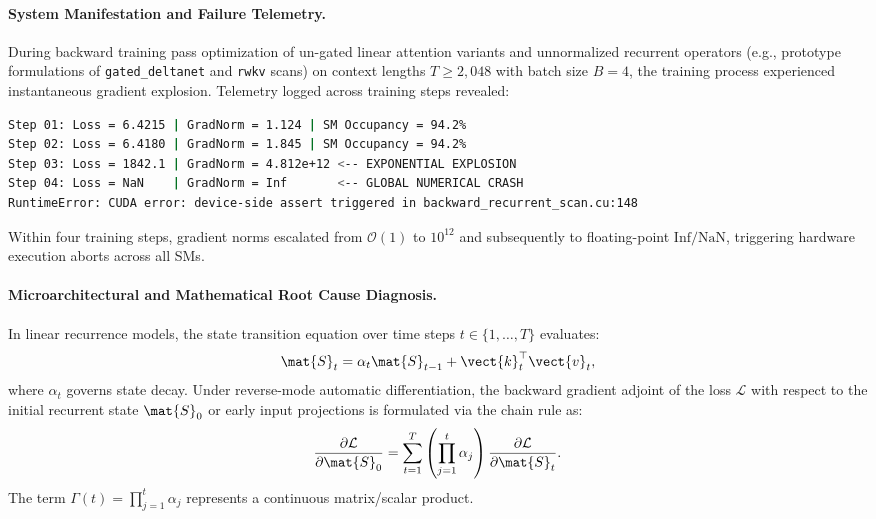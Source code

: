 \paragraph{System Manifestation and Failure Telemetry.}
During backward training pass optimization of un-gated linear attention variants and unnormalized recurrent operators (e.g., prototype formulations of \texttt{gated\_deltanet} and \texttt{rwkv} scans) on context lengths $T \ge 2{,}048$ with batch size $B=4$, the training process experienced instantaneous gradient explosion. Telemetry logged across training steps revealed:
\begin{lstlisting}[language=bash]
Step 01: Loss = 6.4215 | GradNorm = 1.124 | SM Occupancy = 94.2%
Step 02: Loss = 6.4180 | GradNorm = 1.845 | SM Occupancy = 94.2%
Step 03: Loss = 1842.1 | GradNorm = 4.812e+12 <-- EXPONENTIAL EXPLOSION
Step 04: Loss = NaN    | GradNorm = Inf       <-- GLOBAL NUMERICAL CRASH
RuntimeError: CUDA error: device-side assert triggered in backward_recurrent_scan.cu:148
\end{lstlisting}
Within four training steps, gradient norms escalated from $\mathcal{O}(1)$ to $10^{12}$ and subsequently to floating-point $\text{Inf}/\text{NaN}$, triggering hardware execution aborts across all SMs.

\paragraph{Microarchitectural and Mathematical Root Cause Diagnosis.}
In linear recurrence models, the state transition equation over time steps $t \in \{1, \dots, T\}$ evaluates:
\begin{equation}
\mat{S}_t = \alpha_t \mat{S}_{t-1} + \vect{k}_t^\top \vect{v}_t,
\end{equation}
where $\alpha_t$ governs state decay. Under reverse-mode automatic differentiation, the backward gradient adjoint of the loss $\mathcal{L}$ with respect to the initial recurrent state $\mat{S}_0$ or early input projections is formulated via the chain rule as:
\begin{equation}
\label{eq:recurrent_grad_chain}
\frac{\partial \mathcal{L}}{\partial \mat{S}_0} = \sum_{t=1}^T \left( \prod_{j=1}^t \alpha_j \right) \frac{\partial \mathcal{L}}{\partial \mat{S}_t}.
\end{equation}
The term $\Gamma(t) = \prod_{j=1}^t \alpha_j$ represents a continuous matrix/scalar product.

